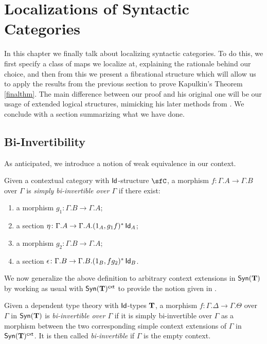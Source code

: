 \chapter{Localizations of Syntactic Categories}\label{chapter4}

In this chapter we finally talk about localizing syntactic categories. To do
this, we first specify a class of maps we localize at, explaining the rationale
behind our choice, and then from this we present a fibrational structure which
will allow us to apply the results from the previous section to prove Kapulkin's
Theorem \ref{finalthm}. The main difference between our proof and his
original one \cite{Kap14} will be our usage of extended logical structures,
mimicking his later methods from \cite{Kap17}. We conclude with a section
summarizing what we have done.

\section{Bi-Invertibility}

As anticipated, we introduce a notion of weak equivalence in our context.

\begin{defn}
  Given a contextual category with $\operatorname{\mathsf{Id}}$-structure $\sfC$, a morphism
  $f\colon\Gamma.A\rightarrow\Gamma.B$ over $\Gamma$ is \emph{simply
    bi-invertible over $\Gamma$} if there exist:
  \begin{enumerate}
    \item a morphism $g_1\colon\Gamma.B\rightarrow\Gamma.A$;
    \item a section
      $\eta\colon\Gamma.A\rightarrow\Gamma.A.(1_{A},g_1f)^*\operatorname{\mathsf{Id}}_{A}$;
    \item a morphism $g_2\colon\Gamma.B\rightarrow\Gamma.A$;
    \item a section
      $\epsilon\colon\Gamma.B\rightarrow\Gamma.B.(1_{B},fg_2)^*\operatorname{\mathsf{Id}}_{B}$.
  \end{enumerate}
\end{defn}

\noindent
We now generalize the above definition to arbitrary context extensions in
$\mathsf{Syn}(\mathbf{T})$ by working as usual with $\mathsf{Syn}(\mathbf{T})^{\operatorname{\mathsf{cxt}}}$ to provide the notion given
in \cite[Def.~1.4]{Kap17}.

\begin{defn}
  Given a dependent type theory with $\operatorname{\mathsf{Id}}$-types $\operatorname{\mathbf{T}}$, a morphism
  $f\colon\Gamma.\Delta\rightarrow\Gamma.\Theta$ over $\Gamma$ in $\mathsf{Syn}(\mathbf{T})$ is
  \emph{bi-invertible over $\Gamma$} if it is simply bi-invertible over $\Gamma$
  as a morphism between the two corresponding simple context extensions of
  $\Gamma$ in $\mathsf{Syn}(\mathbf{T})^{\operatorname{\mathsf{cxt}}}$. It is then called \emph{bi-invertible} if
  $\Gamma$ is the empty context.
\end{defn}

